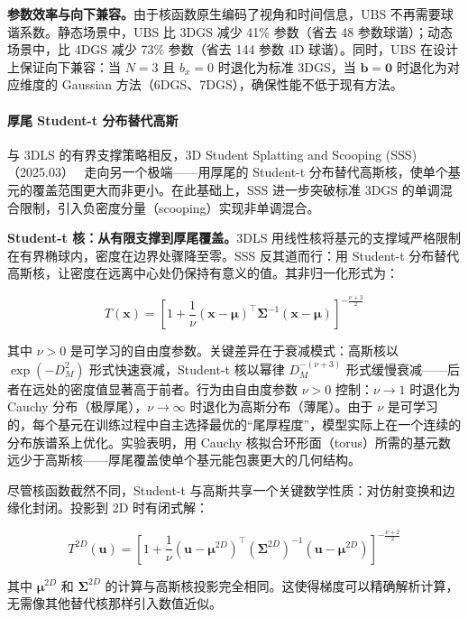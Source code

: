 \textbf{参数效率与向下兼容。}由于核函数原生编码了视角和时间信息，UBS 不再需要球谐系数。静态场景中，UBS 比 3DGS 减少 41\% 参数（省去 48 参数球谐）；动态场景中，比 4DGS 减少 73\% 参数（省去 144 参数 4D 球谐）。同时，UBS 在设计上保证向下兼容：当 $N=3$ 且 $b_x = 0$ 时退化为标准 3DGS，当 $\mathbf{b} = \mathbf{0}$ 时退化为对应维度的 Gaussian 方法（6DGS、7DGS），确保性能不低于现有方法。

\paragraph{厚尾 Student-t 分布替代高斯}

与 3DLS 的有界支撑策略相反，3D Student Splatting and Scooping (SSS)（2025.03）~\cite{2503_10148} 走向另一个极端——用厚尾的 Student-t 分布替代高斯核，使单个基元的覆盖范围更大而非更小。在此基础上，SSS 进一步突破标准 3DGS 的单调混合限制，引入负密度分量（scooping）实现非单调混合。

\textbf{Student-t 核：从有限支撑到厚尾覆盖。}3DLS 用线性核将基元的支撑域严格限制在有界椭球内，密度在边界处骤降至零。SSS 反其道而行：用 Student-t 分布替代高斯核，让密度在远离中心处仍保持有意义的值。其非归一化形式为：

\begin{equation}
T(\mathbf{x}) = \left[1 + \frac{1}{\nu}(\mathbf{x}-\boldsymbol{\mu})^\top \boldsymbol{\Sigma}^{-1}(\mathbf{x}-\boldsymbol{\mu})\right]^{-\frac{\nu+3}{2}}
\end{equation}

其中 $\nu > 0$ 是可学习的自由度参数。关键差异在于衰减模式：高斯核以 $\exp(-D_M^2)$ 形式快速衰减，Student-t 核以幂律 $D_M^{-(\nu+3)}$ 形式缓慢衰减——后者在远处的密度值显著高于前者。行为由自由度参数 $\nu > 0$ 控制：$\nu \to 1$ 时退化为 Cauchy 分布（极厚尾），$\nu \to \infty$ 时退化为高斯分布（薄尾）。由于 $\nu$ 是可学习的，每个基元在训练过程中自主选择最优的``尾厚程度''，模型实际上在一个连续的分布族谱系上优化。实验表明，用 Cauchy 核拟合环形面（torus）所需的基元数远少于高斯核——厚尾覆盖使单个基元能包裹更大的几何结构。

尽管核函数截然不同，Student-t 与高斯共享一个关键数学性质：对仿射变换和边缘化封闭。投影到 2D 时有闭式解：

\begin{equation}
T^{2D}(\mathbf{u}) = \left[1 + \frac{1}{\nu}(\mathbf{u}-\boldsymbol{\mu}^{2D})^\top (\boldsymbol{\Sigma}^{2D})^{-1}(\mathbf{u}-\boldsymbol{\mu}^{2D})\right]^{-\frac{\nu+2}{2}}
\end{equation}

其中 $\boldsymbol{\mu}^{2D}$ 和 $\boldsymbol{\Sigma}^{2D}$ 的计算与高斯核投影完全相同。这使得梯度可以精确解析计算，无需像其他替代核那样引入数值近似。

